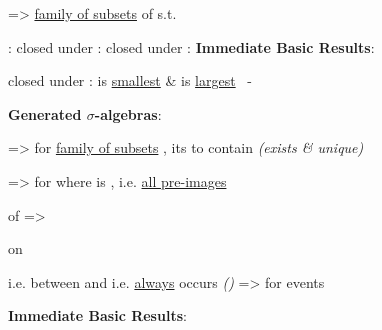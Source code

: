   => 
\ul{family of subsets} of \iMbox{\Omega} s.t.
\begin{enumerate}
  \vItem {}: 
  \vItem closed under : 
  \vItem closed under : 
  \vItem \textbf{Immediate Basic Results}:
  \begin{enumerate}
    \vItem {}
    \vItem closed under :
    \vItem \iMbox{\{\emptyset, \Omega \}} is \ul{smallest} \& 
     is \ul{largest} \ -
  \end{enumerate}
  \vItem \textbf{Generated $\sigma$-algebras}:
  \begin{enumerate}
    \vItem {} => for \ul{family of subsets} ,
    its  to contain  \textit{(exists \& unique)}

    \vItem {} => for  where 
     is ,
    i.e. \ul{all pre-images}

    \vItem {} of  => 
           
  \end{enumerate}
\end{enumerate}

\hSep

  on  
\begin{enumerate}
  \vItem {} i.e. between  and 
  \vItem {} i.e.   \ul{always} occurs
  \vItem {} \textit{()} => 
  for  events 

  \vItem \textbf{Immediate Basic Results}:
  \begin{enumerate}
    \vItem {}
    \vItem {}
    \vItem {}
  \end{enumerate}
\end{enumerate}


